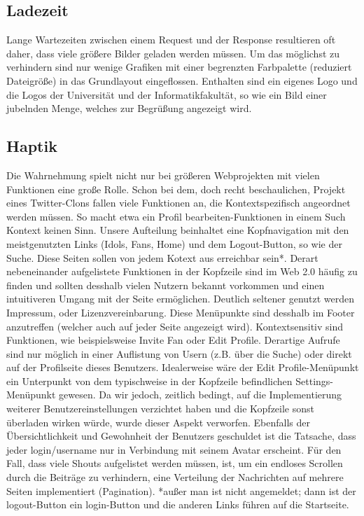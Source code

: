 \subsection{Ladezeit}
Lange Wartezeiten zwischen einem Request und der Response resultieren oft daher, dass viele größere Bilder geladen werden müssen. Um das möglichst zu verhindern sind nur wenige Grafiken mit einer begrenzten Farbpalette (reduziert Dateigröße) in das Grundlayout eingeflossen. Enthalten sind ein eigenes Logo und die Logos der Universität und der Informatikfakultät, so wie ein Bild einer jubelnden Menge, welches zur Begrüßung angezeigt wird.

\subsection{Haptik}
Die Wahrnehmung spielt nicht nur bei größeren Webprojekten mit vielen Funktionen eine große Rolle. Schon bei dem, doch recht beschaulichen, Projekt eines Twitter-Clons fallen viele Funktionen an, die Kontextspezifisch angeordnet werden müssen. So macht etwa ein Profil bearbeiten-Funktionen in einem Such Kontext keinen Sinn. Unsere Aufteilung beinhaltet eine Kopfnavigation mit den meistgenutzten Links (Idols, Fans, Home) und dem Logout-Button, so wie der Suche. Diese Seiten sollen von jedem Kotext aus erreichbar sein*. Derart nebeneinander aufgelistete Funktionen in der Kopfzeile sind im Web 2.0 häufig zu finden und sollten desshalb vielen Nutzern bekannt vorkommen und einen intuitiveren Umgang mit der Seite ermöglichen. Deutlich seltener genutzt werden Impressum, oder Lizenzvereinbarung. Diese Menüpunkte sind desshalb im Footer anzutreffen (welcher auch auf jeder Seite angezeigt wird). Kontextsensitiv sind Funktionen, wie beispielsweise Invite Fan oder Edit Profile. Derartige Aufrufe sind nur möglich in einer Auflistung von Usern (z.B. über die Suche) oder direkt auf der Profilseite dieses Benutzers. Idealerweise wäre der Edit Profile-Menüpunkt ein Unterpunkt von dem typischweise in der Kopfzeile befindlichen Settings-Menüpunkt  gewesen. Da wir jedoch, zeitlich bedingt, auf die Implementierung weiterer Benutzereinstellungen verzichtet haben und die Kopfzeile sonst überladen wirken würde, wurde dieser Aspekt verworfen. Ebenfalls der Übersichtlichkeit und Gewohnheit der Benutzers geschuldet ist die Tatsache, dass jeder login/username nur in Verbindung mit seinem Avatar erscheint. Für den Fall, dass viele Shouts aufgelistet werden müssen, ist, um ein endloses Scrollen durch die Beiträge zu verhindern, eine Verteilung der Nachrichten auf mehrere Seiten implementiert (Pagination).  
*außer man ist nicht angemeldet; dann ist der logout-Button ein login-Button und die anderen Links führen auf die Startseite.


